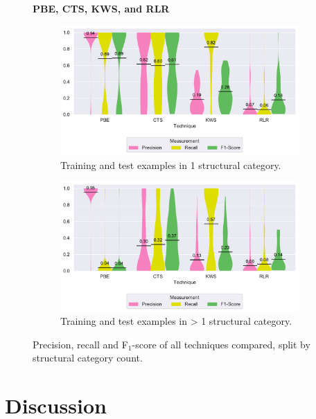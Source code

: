 \begin{figure}
\centering
    \textbf{PBE, CTS, KWS, and RLR}\par\medskip
\begin{subfigure}[b]{\columnwidth}
		\centering
				\includegraphics[width=\columnwidth,
				clip]{img/big-study/recall-precision-singlecategory-all.pdf}
		\caption{Training and test examples in 1
		structural category.}
		\label{fig:recall-precision-singlecategory-all}
\end{subfigure}\hspace{\fill}
\begin{subfigure}[b]{\columnwidth}
		\centering
				\centering
		\includegraphics[width=\columnwidth,
		clip]{img/big-study/recall-precision-multicategory-all.pdf}
		\caption{Training and test examples in \textgreater
		1 structural
		category.}
		\label{fig:recall-precision-multicategory-all}
\end{subfigure}
\caption{Precision, recall and F$_{1}$-score of all
techniques compared, split by structural category count.}
\end{figure}

\section{Discussion}
\label{sec:discussion}

